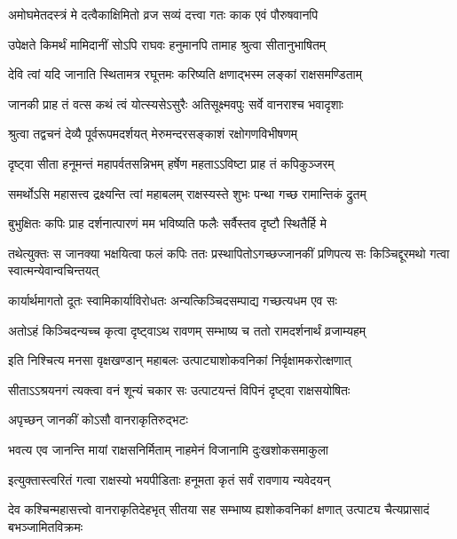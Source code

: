 \twolineshloka
{अमोघमेतदस्त्रं मे दत्वैकाक्षिमितो व्रज}
{सव्यं दत्त्वा गतः काक एवं पौरुषवानपि} %

\twolineshloka
{उपेक्षते किमर्थं मामिदानीं सोऽपि राघवः}
{हनुमानपि तामाह श्रुत्वा सीतानुभाषितम्} %

\twolineshloka
{देवि त्वां यदि जानाति स्थितामत्र रघूत्तमः}
{करिष्यति क्षणाद्भस्म लङ्कां राक्षसमण्डिताम्} %

\twolineshloka
{जानकी प्राह तं वत्स कथं त्वं योत्स्यसेऽसुरैः}
{अतिसूक्ष्मवपुः सर्वे वानराश्च भवादृशाः} %

\twolineshloka
{श्रुत्वा तद्वचनं देव्यै पूर्वरूपमदर्शयत्}
{मेरुमन्दरसङ्काशं रक्षोगणविभीषणम्} %

\twolineshloka
{दृष्ट्वा सीता हनूमन्तं महापर्वतसन्निभम्}
{हर्षेण महताऽऽविष्टा प्राह तं कपिकुञ्जरम्} %

\twolineshloka
{समर्थोऽसि महासत्त्व द्रक्ष्यन्ति त्वां महाबलम्}
{राक्षस्यस्ते शुभः पन्था गच्छ रामान्तिकं द्रुतम्} %

\twolineshloka
{बुभुक्षितः कपिः प्राह दर्शनात्पारणं मम}
{भविष्यति फलैः सर्वैस्तव दृष्टौ स्थितैर्हि मे} %

\threelineshloka
{तथेत्युक्तः स जानक्या भक्षयित्वा फलं कपिः}
{ततः प्रस्थापितोऽगच्छज्जानकीं प्रणिपत्य सः}
{किञ्चिद्दूरमथो गत्वा स्वात्मन्येवान्वचिन्तयत्} %

\twolineshloka
{कार्यार्थमागतो दूतः स्वामिकार्याविरोधतः}
{अन्यत्किञ्चिदसम्पाद्य गच्छत्यधम एव सः} %

\twolineshloka
{अतोऽहं किञ्चिदन्यच्च कृत्वा दृष्ट्वाऽथ रावणम्}
{सम्भाष्य च ततो रामदर्शनार्थं व्रजाम्यहम्} %

\twolineshloka
{इति निश्चित्य मनसा वृक्षखण्डान् महाबलः}
{उत्पाट्याशोकवनिकां निर्वृक्षामकरोत्क्षणात्} %

\twolineshloka
{सीताऽऽश्रयनगं त्यक्त्वा वनं शून्यं चकार सः}
{उत्पाटयन्तं विपिनं दृष्ट्वा राक्षसयोषितः} %

\onelineshloka
{अपृच्छन् जानकीं कोऽसौ वानराकृतिरुद्भटः} %



\twolineshloka
{भवत्य एव जानन्ति मायां राक्षसनिर्मिताम्}
{नाहमेनं विजानामि दुःखशोकसमाकुला} %

\twolineshloka
{इत्युक्तास्त्वरितं गत्वा राक्षस्यो भयपीडिताः}
{हनूमता कृतं सर्वं रावणाय न्यवेदयन्} %

\threelineshloka
{देव कश्चिन्महासत्त्वो वानराकृतिदेहभृत्}
{सीतया सह सम्भाष्य ह्यशोकवनिकां क्षणात्}
{उत्पाट्य चैत्यप्रासादं बभञ्जामितविक्रमः} %

